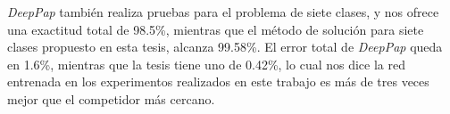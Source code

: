 \begin{table}[H]
  \centering
  \caption{Comparativa para el problema binario}\label{tabla:comparativa2}
  \end{table}

\emph{DeepPap} también realiza pruebas para el problema de siete
clases, y nos ofrece una exactitud total de 98.5\%, mientras que el método de
solución para siete clases propuesto en esta tesis, alcanza 99.58\%. El error
total de \emph{DeepPap} queda en 1.6\%, mientras que la tesis tiene uno de
0.42\%, lo cual nos dice la red entrenada en los experimentos realizados
en este trabajo es más de tres veces mejor que el competidor más cercano. 
